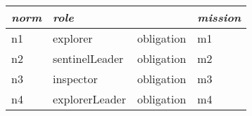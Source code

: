 \setlength{\tabcolsep}{12pt}
\begin{tabular}{llll}
\emph{norm} & \emph{role} &   & \emph{mission}\\
\midrule
n1 & explorer & obligation & m1\\
n2 & sentinelLeader & obligation & m2\\
n3 & inspector & obligation & m3\\
n4 & explorerLeader & obligation & m4
\end{tabular}

